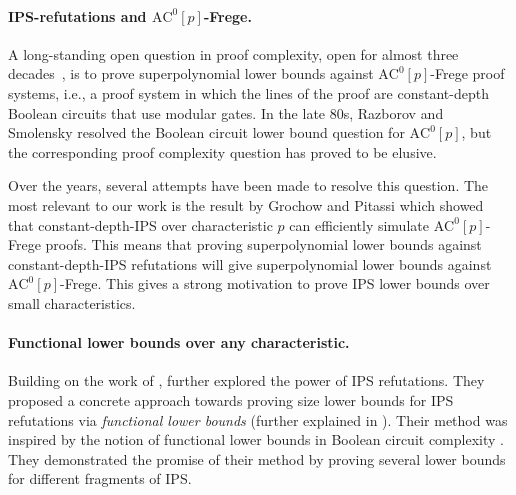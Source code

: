 \documentclass[11pt]{article}
\newcommand{\roABP}{\mathrm{roABP}}
\newcommand{\ACz}{\text{AC}^0}
\begin{document}
\paragraph{IPS-refutations and $\ACz[p]$-Frege.}
A long-standing open question in proof complexity, open for almost three decades~\cite{kra2015}, is to prove superpolynomial lower bounds against $\ACz[p]$-Frege proof systems, i.e., a proof system in which the lines of the proof are constant-depth Boolean circuits that use modular gates. In the late 80s, Razborov \cite{Razborov1987} and Smolensky \cite{Smolensky1987, Smolensky1993} resolved the Boolean circuit lower bound question for $\ACz[p]$, but the corresponding proof complexity question has proved to be elusive. 

Over the years, several attempts have been made to resolve this question. The most relevant to our work is the result by Grochow and Pitassi \cite[Theorem 3.5]{GP14} which showed that constant-depth-IPS over characteristic $p$ can efficiently simulate $\ACz[p]$-Frege proofs. This means that proving superpolynomial lower bounds against constant-depth-IPS refutations will give superpolynomial lower bounds against $\ACz[p]$-Frege. This gives a strong motivation to prove IPS lower bounds over small characteristics. 


\paragraph{Functional lower bounds over any characteristic.}
Building on the work of \cite{GP14}, \cite{FSTW21} further explored the power of IPS refutations. They proposed a concrete approach towards proving size lower bounds for IPS refutations via 
\emph{functional lower bounds} (further explained in ). Their method was inspired by the notion of functional lower bounds in Boolean circuit complexity \cite{Grigoriev-Razborov, FKS16}. They demonstrated the promise of their method by proving several lower bounds for different fragments of IPS.

\end{document}

